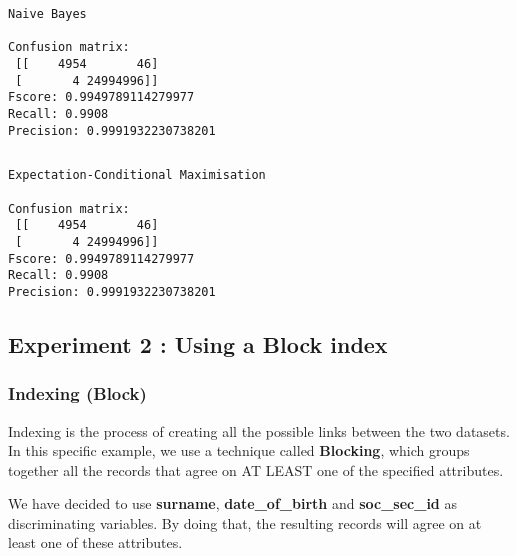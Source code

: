 \documentclass{article}
\begin{document}
    \begin{Verbatim}[commandchars=\\\{\}]

\end{Verbatim}

    \begin{Verbatim}[commandchars=\\\{\}]
Naive Bayes 

Confusion matrix: 
 [[    4954       46]
 [       4 24994996]]
Fscore: 0.9949789114279977
Recall: 0.9908
Precision: 0.9991932230738201

    \end{Verbatim}

    \begin{Verbatim}[commandchars=\\\{\}]

\end{Verbatim}

    \begin{Verbatim}[commandchars=\\\{\}]
Expectation-Conditional Maximisation 

Confusion matrix: 
 [[    4954       46]
 [       4 24994996]]
Fscore: 0.9949789114279977
Recall: 0.9908
Precision: 0.9991932230738201

    \end{Verbatim}

    \hypertarget{experiment-2-using-a-block-index}{%
\subsection{Experiment 2 : Using a Block
index}\label{experiment-2-using-a-block-index}}

\hypertarget{indexing-block}{%
\subsubsection{Indexing (Block)}\label{indexing-block}}

Indexing is the process of creating all the possible links between the
two datasets. In this specific example, we use a technique called
\textbf{Blocking}, which groups together all the records that agree on
AT LEAST one of the specified attributes.

We have decided to use \textbf{surname}, \textbf{date\_of\_birth} and
\textbf{soc\_sec\_id} as discriminating variables. By doing that, the
resulting records will agree on at least one of these attributes.
\end{document}
